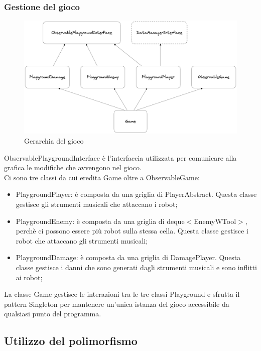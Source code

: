 \documentclass[11pt]{article}
\begin{document}
\subsubsection{Gestione del gioco}

\begin{figure}[ht]
	\centering
	\includegraphics[scale=0.045]{assets/game}
	\caption{Gerarchia del gioco}
\end{figure}

ObservablePlaygroundInterface è l'interfaccia utilizzata per comunicare alla
grafica le modifiche che avvengono nel gioco. \\
Ci sono tre classi da cui eredita Game oltre a ObservableGame:
\begin{itemize}
	\item PlaygroundPlayer: è composta da una griglia di PlayerAbstract. Questa
		classe gestisce gli strumenti musicali che attaccano i robot;
		 
	\item PlaygroundEnemy: è composta da una griglia di deque$<$EnemyWTool$>$,
		perchè ci possono essere più robot sulla stessa cella. 
		Questa classe gestisce i robot che attaccano gli strumenti musicali;

	\item PlaygroundDamage: è composta da una griglia di DamagePlayer. Questa
		classe gestisce i danni che sono generati dagli strumenti musicali e
		sono inflitti ai robot;
\end{itemize}
La classe Game gestisce le interazioni tra le tre classi Playground e sfrutta il
pattern Singleton per mantenere un'unica istanza del gioco accessibile da
qualsiasi punto del programma.

\subsection{Utilizzo del polimorfismo}
\end{document}
